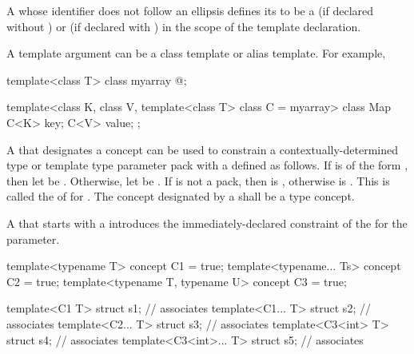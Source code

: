 \pnum
A
whose identifier does not follow an ellipsis
defines its
to be a
(if declared without
)
or
(if declared with
)
in the scope of the template declaration.
\begin{note}
A template argument can be a class template or alias template.
For example,

\begin{codeblock}
template<class T> class myarray { @\commentellip@ };

template<class K, class V, template<class T> class C = myarray>
class Map {
  C<K> key;
  C<V> value;
};
\end{codeblock}
\end{note}

\pnum
A   that designates a concept 
can be used to constrain a
contextually-determined type or template type parameter pack 
with a   defined as follows.
If  is of the form ,
then let  be .
Otherwise, let  be .
If  is not a pack,
then  is ,
otherwise  is .
This   is called the
of  for .
The concept designated by a 
shall be a type concept.

\pnum
A  that starts with a 
introduces the immediately-declared constraint
of the  for the parameter.
\begin{example}
\begin{codeblock}
template<typename T> concept C1 = true;
template<typename... Ts> concept C2 = true;
template<typename T, typename U> concept C3 = true;

template<C1 T> struct s1;               // associates 
template<C1... T> struct s2;            // associates 
template<C2... T> struct s3;            // associates 
template<C3<int> T> struct s4;          // associates 
template<C3<int>... T> struct s5;       // associates 
\end{codeblock}
\end{example}

